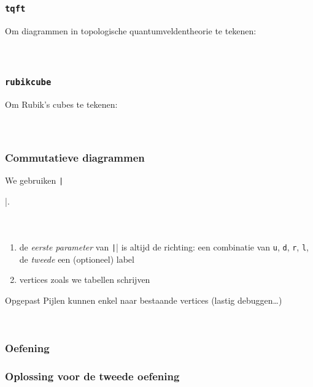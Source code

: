\begin{frame}
  \frametitle{\texttt{tqft}}
  
  Om diagrammen in topologische quantumveldentheorie te tekenen:
  \begin{columns}
    \begin{column}{.6\textwidth}
      \inputminted[fontsize = \scriptsize]{latex}{tikz/tqft.tikz}
    \end{column}
    \begin{column}{.4\textwidth}
      
    \end{column}
  \end{columns}
\end{frame}

\begin{frame}
  \frametitle{\texttt{rubikcube}}

  Om Rubik's cubes te tekenen:
  \begin{columns}
    \begin{column}{.6\textwidth}
      \inputminted[fontsize = \scriptsize]{latex}{tikz/rubikcube.tikz}
    \end{column}
    \begin{column}{.4\textwidth}
      
    \end{column}
  \end{columns}
\end{frame}

\begin{frame}[fragile]
  \frametitle{Commutatieve diagrammen}

  \small
  We gebruiken \texttt|\usepackage{tikz-cd}|.
  \begin{columns}
    \begin{column}{.67\textwidth}
      \inputminted[fontsize = \scriptsize]{latex}{tikz/diagrams/1.tikz}
    \end{column}
    \begin{column}{.33\textwidth}
      
    \end{column}
  \end{columns}
  \small
  \begin{enumerate}
    \item\pause de \emph{eerste parameter} van \texttt|\arrow| is altijd de richting: een combinatie van \texttt{u}, \texttt{d}, \texttt{r}, \texttt{l}, de \emph{tweede} een (optioneel) label
    \item\pause vertices zoals we tabellen schrijven 
  \end{enumerate}
  \begin{alertblock}{Opgepast}
    \dbend\quad Pijlen kunnen enkel naar bestaande vertices (lastig debuggen\ldots)

    {\ }
  \end{alertblock}
\end{frame}

\begin{frame}
  \frametitle{Oefening}

  \footnotesize
  
  
\end{frame}

\begin{frame}[fragile]
  \frametitle{Oplossing voor de tweede oefening}

  \inputminted{latex}{tikz/diagrams/3.tikz}
\end{frame}
